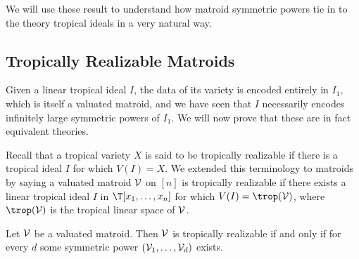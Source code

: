 We will use these result to understand how matroid symmetric powers tie in to the theory tropical ideals in a very natural way.

\subsection{Tropically Realizable Matroids}\label{subsec:TropRealizableMatroids}

Given a linear tropical ideal $I$, the data of its variety is encoded entirely in $I_1$, which is itself a valuated matroid, and we have seen that $I$ necessarily encodes infinitely large symmetric powers of $I_1$. We will now prove that these are in fact equivalent theories.

Recall that a tropical variety $X$ is said to be tropically realizable if there is a tropical ideal $I$ for which $V(I)= X$. We extended this terminology to matroids by saying a valuated matroid $\mathcal{V}$ on $[n]$ is tropically realizable if there exists a linear tropical ideal $I$ in $\T[x_1,\dots,x_n]$ for which $V(I)=\trop(\sV)$, where $\trop(\sV)$ is the tropical linear space of $\mathcal{V}$.

\begin{theorem}\label{thm:linearMatroidCorres}
Let $\mathcal{V}$ be a valuated matroid. Then $\mathcal{V}$ is tropically realizable if and only if for every $d$ some symmetric power $(\mathcal{V}_1,\dots,\mathcal{V}_d)$ exists.
\end{theorem}

